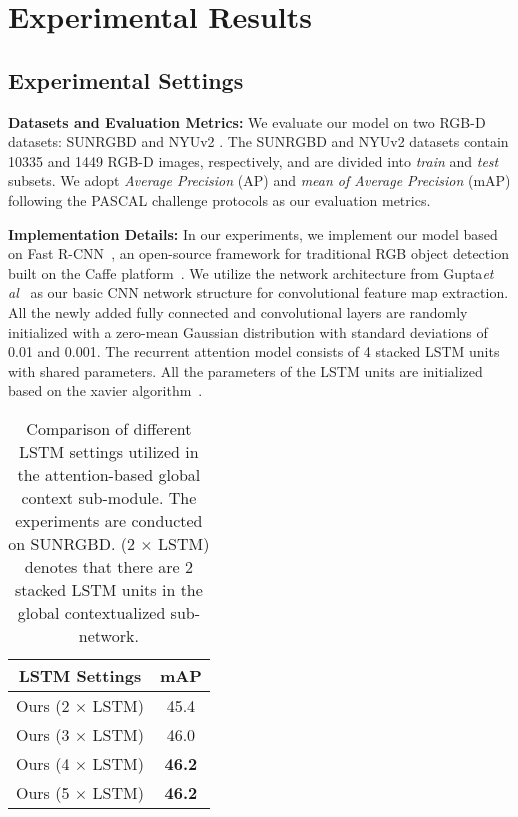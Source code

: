 \documentclass[journal]{IEEEtran}
\begin{document}
\section{Experimental Results}

\subsection{Experimental Settings}

\textbf{Datasets and Evaluation Metrics:} We evaluate our model on two RGB-D datasets: SUNRGBD \cite{song2015sun} and NYUv2 \cite{silberman2012indoor}. The SUNRGBD and NYUv2 datasets contain 10335 and 1449 RGB-D images, respectively, and are divided into \textit{train} and \textit{test} subsets. We adopt \textit{Average Precision} (AP) and \textit{mean of Average Precision} (mAP) following the PASCAL challenge protocols as our evaluation metrics.

\textbf{Implementation Details:} In our experiments, we implement our model based on Fast R-CNN~\cite{fast-rcnn}, an open-source framework for traditional RGB object detection built on the Caffe platform~\cite{jia2014caffe}. We utilize the network architecture from Gupta\textit{et al}~\cite{gupta2016cross} as our basic CNN network structure for convolutional feature map extraction. All the newly added fully connected and convolutional layers are randomly initialized with a zero-mean Gaussian distribution with standard deviations of 0.01 and 0.001. The recurrent attention model consists of 4 stacked LSTM units with shared parameters. All the parameters of the LSTM units are initialized based on the xavier algorithm~\cite{glorot2010understanding}.

\begin{table} \centering \renewcommand{}
	\caption{\label{table:4} Comparison of different LSTM settings utilized in the attention-based global context sub-module. The experiments are conducted on SUNRGBD. (2 $\times$ LSTM) denotes that there are 2 stacked LSTM units in the global contextualized sub-network.}
	\begin{tabular}{c|c}
	\toprule
	\textbf{LSTM Settings}&\textbf{mAP} \\
	\midrule
	Ours (2 $\times$ LSTM)  & 45.4 \\
	Ours (3 $\times$ LSTM)  & 46.0 \\	
	Ours (4 $\times$ LSTM)  & \textbf{46.2} \\
	Ours (5 $\times$ LSTM)  & \textbf{46.2} \\
	\bottomrule
	\end{tabular}
\end{table}
\end{document}
